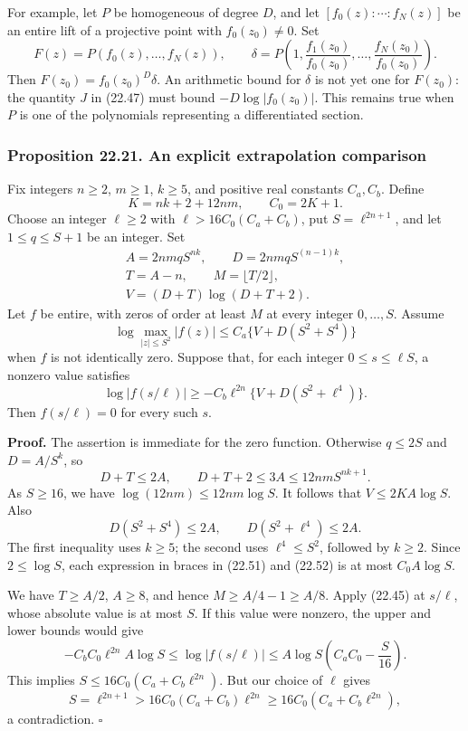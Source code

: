 \documentclass[
  11pt,
  a4paper,
]{article}
\begin{document}
For example, let \(P\) be homogeneous of degree \(D\), and let
\([f_0(z):\cdots:f_N(z)]\) be an entire lift of a projective point with
\(f_0(z_0)\ne0\). Set \[
 F(z)=P(f_0(z),\ldots,f_N(z)),\qquad
 \delta=P\left(1,\frac{f_1(z_0)}{f_0(z_0)},\ldots,
                    \frac{f_N(z_0)}{f_0(z_0)}\right).
 \tag{22.48}
\] Then \(F(z_0)=f_0(z_0)^D\delta\). An arithmetic bound for \(\delta\)
is not yet one for \(F(z_0)\): the quantity \(J\) in (22.47) must bound
\(-D\log|f_0(z_0)|\). This remains true when \(P\) is one of the
polynomials representing a differentiated section.

\subsubsection{Proposition 22.21. An explicit extrapolation
comparison}\label{proposition-22.21.-an-explicit-extrapolation-comparison}

Fix integers \(n\ge2\), \(m\ge1\), \(k\ge5\), and positive real
constants \(C_a,C_b\). Define \[
 K=nk+2+12nm,\qquad C_0=2K+1.
 \tag{22.49}
\] Choose an integer \(\ell\ge2\) with \(\ell>16C_0(C_a+C_b)\), put
\(S=\ell^{2n+1}\), and let \(1\le q\le S+1\) be an integer. Set \[
\begin{gathered}
 A=2nmqS^{nk},\qquad D=2nmqS^{(n-1)k},\\
 T=A-n,\qquad M=\lfloor T/2\rfloor,\\
 V=(D+T)\log(D+T+2).
\end{gathered}
\tag{22.50}
\] Let \(f\) be entire, with zeros of order at least \(M\) at every
integer \(0,\ldots,S\). Assume \[
 \log\max_{|z|\le S^2}|f(z)|
 \le C_a\{V+D(S^2+S^4)\}
 \tag{22.51}
\] when \(f\) is not identically zero. Suppose that, for each integer
\(0\le s\le\ell S\), a nonzero value satisfies \[
 \log|f(s/\ell)|
 \ge-C_b\ell^{2n}\{V+D(S^2+\ell^4)\}.
 \tag{22.52}
\] Then \(f(s/\ell)=0\) for every such \(s\).

\textbf{Proof.} The assertion is immediate for the zero function.
Otherwise \(q\le2S\) and \(D=A/S^k\), so \[
 D+T\le2A,\qquad D+T+2\le3A\le12nmS^{nk+1}.
\] As \(S\ge16\), we have \(\log(12nm)\le12nm\log S\). It follows that
\(V\le2KA\log S\). Also \[
 D(S^2+S^4)\le2A,\qquad D(S^2+\ell^4)\le2A.
\] The first inequality uses \(k\ge5\); the second uses
\(\ell^4\le S^2\), followed by \(k\ge2\). Since \(2\le\log S\), each
expression in braces in (22.51) and (22.52) is at most \(C_0A\log S\).

We have \(T\ge A/2\), \(A\ge8\), and hence \(M\ge A/4-1\ge A/8\). Apply
(22.45) at \(s/\ell\), whose absolute value is at most \(S\). If this
value were nonzero, the upper and lower bounds would give \[
 -C_bC_0\ell^{2n}A\log S
 \le\log|f(s/\ell)|
 \le A\log S\left(C_aC_0-\frac S{16}\right).
 \tag{22.53}
\] This implies \(S\le16C_0(C_a+C_b\ell^{2n})\). But our choice of
\(\ell\) gives \[
 S=\ell^{2n+1}>16C_0(C_a+C_b)\ell^{2n}
 \ge16C_0(C_a+C_b\ell^{2n}),
\] a contradiction. \(\square\)
\end{document}
